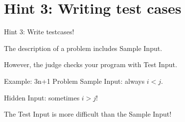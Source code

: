 




\section{Hint 3: Writing test cases}

\begin{frame}{Hint 3: Write testcases!}

  The description of a problem includes \alert{Sample Input}.\bigskip

  However, the judge checks your program with \alert{Test Input}.\bigskip

  \begin{exampleblock}{Example: 3n+1 Problem}
    Sample Input: always $i < j$.\medskip

    Hidden Input: sometimes $i > j$!\medskip
  \end{exampleblock}\bigskip

  \alert{The Test Input is more difficult than the Sample Input}!

\end{frame}



